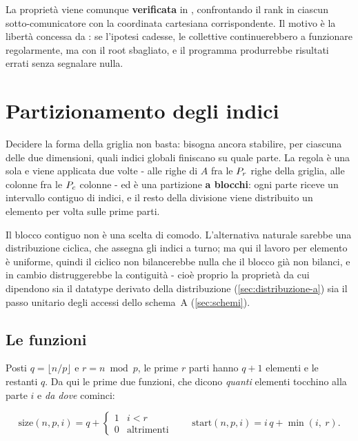 La proprietà viene comunque \textbf{verificata} in ,
confrontando il rank in ciascun sotto-comunicatore con la coordinata
cartesiana corrispondente. Il motivo è la libertà concessa da
: se l'ipotesi cadesse, le collettive continuerebbero a
funzionare regolarmente, ma con il root sbagliato, e il programma produrrebbe
risultati errati senza segnalare nulla.

\section{Partizionamento degli indici}
\label{sec:indici}

Decidere la forma della griglia non basta: bisogna ancora stabilire, per
ciascuna delle due dimensioni, quali indici globali finiscano su quale parte.
La regola è una sola e viene applicata due volte - alle righe di $A$ fra le
$P_r$ righe della griglia, alle colonne fra le $P_c$ colonne - ed è una
partizione \textbf{a blocchi}: ogni parte riceve un intervallo contiguo di
indici, e il resto della divisione viene distribuito un elemento per volta
sulle prime parti.

Il blocco contiguo non è una scelta di comodo. L'alternativa naturale sarebbe
una distribuzione ciclica, che assegna gli indici a turno; ma qui il lavoro per
elemento è uniforme, quindi il ciclico non bilancerebbe nulla che il blocco già
non bilanci, e in cambio distruggerebbe la contiguità - cioè proprio la
proprietà da cui dipendono sia il datatype derivato della distribuzione
(\cref{sec:distribuzione-a}) sia il passo unitario degli accessi dello schema~A
(\cref{sec:schemi}).

\subsection{Le funzioni}

Posti $q = \lfloor n/p \rfloor$ e $r = n \bmod p$, le prime $r$ parti hanno
$q+1$ elementi e le restanti $q$. Da qui le prime due funzioni, che dicono
\emph{quanti} elementi tocchino alla parte $i$ e \emph{da dove} cominci:

\begin{equation}
  \mathrm{size}(n,p,i) = q +
      \begin{cases} 1 & i < r\\ 0 & \text{altrimenti}\end{cases}
  \qquad
  \mathrm{start}(n,p,i) = i\,q + \min(i,\ r).
  \label{eq:partizione}
\end{equation}

